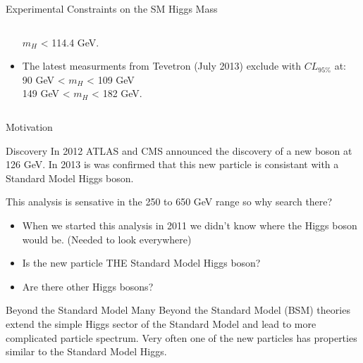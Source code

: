 \begin{frame}{Experimental Constraints on the SM Higgs Mass}
\begin{center}
\begin{columns}
\begin{column}{0.5\textwidth}
\begin{itemize}
  \vspace{.5em}
  $m_H$ < 114.4 GeV.\\
  \vspace{1em}
\item
  The latest measurments from Tevetron (July 2013) exclude with $CL_{95\%}$ at:\\
  \vspace{.5em}
  90 GeV < $m_H$ < 109 GeV\\
  149 GeV < $m_H$ < 182 GeV.
\end{itemize}
\end{column}
\end{columns}
\end{center}
\end{frame}

\begin{frame}{Motivation}
\begin{block}{Discovery}
In 2012 ATLAS and CMS announced the discovery of a new boson at 126 GeV.  In 2013 is was confirmed that this new particle is consistant with a Standard Model Higgs boson.
\end{block}
This analysis is sensative in the 250 to 650 GeV range so why search there?
\begin{itemize}
\item
When we started this analysis in 2011 we didn't know where the Higgs boson would be. (Needed to look everywhere)
\item
Is the new particle THE Standard Model Higgs boson?
\item
Are there other Higgs bosons?
\end{itemize}
\footnotesize
\begin{block}{Beyond the Standard Model}
Many Beyond the Standard Model (BSM) theories extend the simple Higgs sector of the Standard Model and lead to more complicated particle spectrum. Very often one of the new particles has properties similar to the Standard Model Higgs.
\end{block}
\end{frame}







